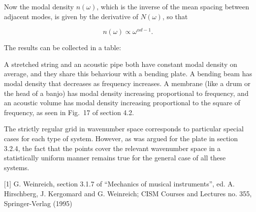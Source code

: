   Now the modal density $n(\omega)$, which is the inverse of the mean spacing 
  between adjacent modes, is given by the derivative of $N(\omega)$, so that 

  \begin{equation*}n(\omega) \propto \omega^{\alpha d -1} . 
  \tag{3}\end{equation*} 

  The results can be collected in a table: 

  A stretched string and an acoustic pipe both have constant modal density on 
  average, and they share this behaviour with a bending plate. A bending beam 
  has modal density that decreases as frequency increases. A membrane (like a 
  drum or the head of a banjo) has modal density increasing proportional to 
  frequency, and an acoustic volume has modal density increasing proportional 
  to the square of frequency, as seen in Fig.\ 17 of section 4.2. 

  The strictly regular grid in wavenumber space corresponds to particular 
  special cases for each type of system. However, as was argued for the plate 
  in section 3.2.4, the fact that the points cover the relevant wavenumber 
  space in a statistically uniform manner remains true for the general case of 
  all these systems. 

  \sectionreferences{}[1] G. Weinreich, section 3.1.7 of ``Mechanics of musical 
  instruments'', ed. A. Hirschberg, J. Kergomard and G. Weinreich; CISM Courses 
  and Lectures no. 355, Springer-Verlag (1995) 